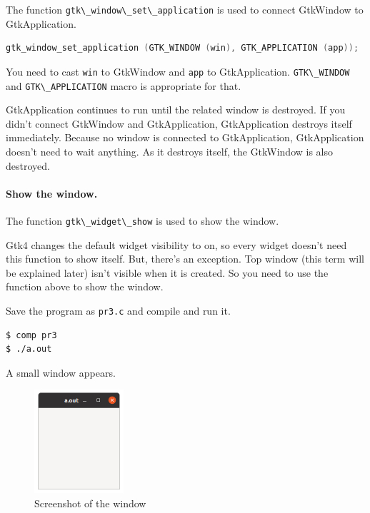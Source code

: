 The function \passthrough{\lstinline!gtk\_window\_set\_application!} is
used to connect GtkWindow to GtkApplication.

\begin{lstlisting}[language=C]
gtk_window_set_application (GTK_WINDOW (win), GTK_APPLICATION (app));
\end{lstlisting}

You need to cast \passthrough{\lstinline!win!} to GtkWindow and
\passthrough{\lstinline!app!} to GtkApplication.
\passthrough{\lstinline!GTK\_WINDOW!} and
\passthrough{\lstinline!GTK\_APPLICATION!} macro is appropriate for
that.

GtkApplication continues to run until the related window is destroyed.
If you didn't connect GtkWindow and GtkApplication, GtkApplication
destroys itself immediately. Because no window is connected to
GtkApplication, GtkApplication doesn't need to wait anything. As it
destroys itself, the GtkWindow is also destroyed.

\hypertarget{show-the-window.}{%
\paragraph{Show the window.}\label{show-the-window.}}

The function \passthrough{\lstinline!gtk\_widget\_show!} is used to show
the window.

Gtk4 changes the default widget visibility to on, so every widget
doesn't need this function to show itself. But, there's an exception.
Top window (this term will be explained later) isn't visible when it is
created. So you need to use the function above to show the window.

Save the program as \passthrough{\lstinline!pr3.c!} and compile and run
it.

\begin{lstlisting}
$ comp pr3
$ ./a.out
\end{lstlisting}

A small window appears.

\begin{figure}
\centering
\includegraphics[width=3.3cm,height=3.825cm]{../image/screenshot_pr3.png}
\caption{Screenshot of the window}
\end{figure}

